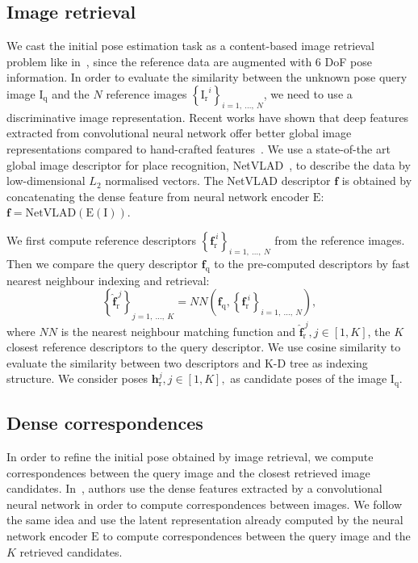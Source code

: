 \subsection{Image retrieval}
\label{subsec:image_indexing}

We cast the initial pose estimation task as a content-based image retrieval problem like in~\cite{Balntas2018}, since the reference data are augmented with 6 DoF pose information. In order to evaluate the similarity between the unknown pose query image $\mathrm{I_{q}}$ and the $N$ reference images $\left\{\mathrm{I_{r}}^{i} \right\}_{i=1,\ \ldots ,\ N}$, we need to use a discriminative image representation. Recent works have shown that deep features extracted from convolutional neural network offer better global image representations compared to hand-crafted features~\cite{Razavian2014a, Arandjelovic2017, Gordo2017, Radenovic2017}. We use a state-of-the art global image descriptor for place recognition, NetVLAD~\cite{Arandjelovic2017}, to describe the data by low-dimensional $L_2$ normalised vectors. The NetVLAD descriptor $\mathbf{f}$ is obtained by concatenating the dense feature from neural network encoder $\mathrm{E}$: $\mathbf{f} = \mathrm{NetVLAD}(\mathrm{E}(\mathrm{I}))$.

We first compute reference descriptors $\left\{ \mathbf{f}_{\mathrm{r}}^{\ i} \right\}_{i=1,\ \ldots ,\ N}$ from the reference images. Then we compare the query descriptor $\mathbf{f}_{\mathrm{q}}$ to the pre-computed descriptors by fast nearest neighbour indexing and retrieval:
\begin{equation}
	\left\{ \mathbf{\hat{f}}_{\mathrm{r}}^{\ j} \right\}_{j=1,\ \ldots ,\ K} = NN \left( \mathbf{f}_{\mathrm{q}}, \left\{ \mathbf{f}_{\mathrm{r}}^{\ i} \right\}_{i=1,\ \ldots ,\ N} \right),
\end{equation}
where $NN$ is the nearest neighbour matching function and $\mathbf{\hat{f}}_{\mathrm{r}}^{\ j}, j \in [1, K]$, the $K$ closest reference descriptors to the query descriptor. We use cosine similarity to evaluate the similarity between two descriptors and K-D tree as indexing structure. We consider poses $\mathbf{h}_\mathrm{r}^j, j \in [1, K],$ as candidate poses of the image $\mathrm{I_q}$.

\subsection{Dense correspondences}
\label{subsec:matching}

In order to refine the initial pose obtained by image retrieval, we compute correspondences between the query image and the closest retrieved image candidates. In~\citep{Taira2018}, authors use the dense features extracted by a convolutional neural network in order to compute correspondences between images. We follow the same idea and use the latent representation already computed by the neural network encoder $\mathrm{E}$ to compute correspondences between the query image and the $K$ retrieved candidates.

